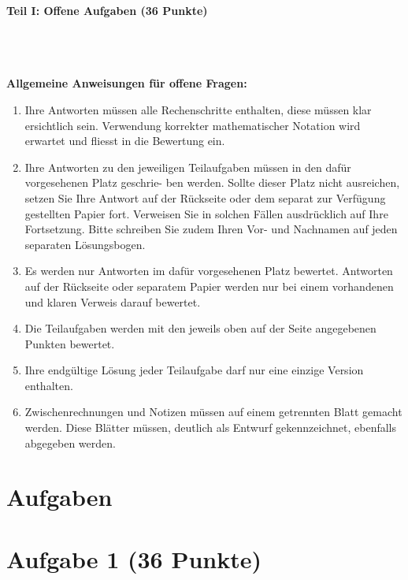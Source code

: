 

\begin{Large}
\textbf{Teil I: Offene Aufgaben (36 Punkte)}
\end{Large}
\\
\\
\\
\textbf{Allgemeine Anweisungen für offene Fragen:}
\\
\renewcommand{\labelenumi}{(\roman{enumi})}
\begin{enumerate}
\item
Ihre Antworten müssen alle Rechenschritte enthalten,
diese müssen klar ersichtlich sein.
Verwendung korrekter mathematischer Notation wird erwartet
und fliesst in die Bewertung ein.

\item
Ihre Antworten zu den jeweiligen Teilaufgaben müssen in den dafür vorgesehenen Platz geschrie-
ben werden. Sollte dieser Platz nicht ausreichen, setzen Sie Ihre Antwort auf der Rückseite oder
dem separat zur Verfügung gestellten Papier fort. Verweisen Sie in solchen Fällen ausdrücklich
auf Ihre Fortsetzung. Bitte schreiben Sie zudem Ihren Vor- und Nachnamen auf jeden separaten
Lösungsbogen.

\item
Es werden nur Antworten im dafür vorgesehenen Platz bewertet. Antworten auf der Rückseite
oder separatem Papier werden nur bei einem vorhandenen und klaren Verweis darauf bewertet.

\item
Die Teilaufgaben werden mit den jeweils oben auf der Seite angegebenen Punkten bewertet.

\item
Ihre endgültige Lösung jeder Teilaufgabe darf nur eine einzige Version enthalten.

\item
Zwischenrechnungen und Notizen müssen auf einem getrennten Blatt gemacht werden. Diese
Blätter müssen, deutlich als Entwurf gekennzeichnet, ebenfalls abgegeben werden.
\end{enumerate}

\newpage
\section*{\hfil Aufgaben \hfil}
\vspace{1cm}
\section*{Aufgabe 1 (36 Punkte)}
\vspace{0.4cm}
